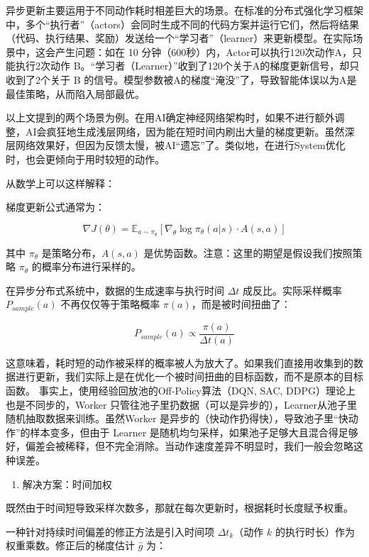 异步更新主要运用于不同动作耗时相差巨大的场景。在标准的分布式强化学习框架中，多个``执行者''（actors）会同时生成不同的代码方案并运行它们，然后将结果（代码、执行结果、奖励）发送给一个``学习者''（learner）来更新模型。在实际场景中，这会产生问题：如在 10 分钟（600秒）内，Actor可以执行120次动作A，只能执行2次动作 B。``学习者（Learner）''收到了120个关于A的梯度更新信号，却只收到了2个关于 B 的信号。模型参数被A的梯度``淹没''了，导致智能体误以为A是最佳策略，从而陷入局部最优。

以上文提到的两个场景为例。在用AI确定神经网络架构时，如果不进行额外调整，AI会疯狂地生成浅层网络，因为能在短时间内刷出大量的梯度更新。虽然深层网络效果好，但因为反馈太慢，被AI``遗忘''了。类似地，在进行System优化时，也会更倾向于用时较短的动作。

从数学上可以这样解释：

梯度更新公式通常为：

\[
\nabla J(\theta)=\mathbb{E}_{a\sim\pi_\theta}\left[\nabla_\theta\log\pi_\theta(a|s)\cdot A(s,a)\right]
\]

其中 \(\pi_\theta\) 是策略分布，\(A(s,a)\) 是优势函数。注意：这里的期望是假设我们按照策略 \(\pi_\theta\) 的概率分布进行采样的。

在异步分布式系统中，数据的生成速率与执行时间 \(\Delta t\) 成反比。实际采样概率 \(P_{sample}(a)\) 不再仅仅等于策略概率 \(\pi(a)\)，而是被时间扭曲了：

\[
P_{sample}(a)\propto \frac{\pi(a)}{\Delta t(a)}
\]

这意味着，耗时短的动作被采样的概率被人为放大了。如果我们直接用收集到的数据进行更新，我们实际上是在优化一个被时间扭曲的目标函数，而不是原本的目标函数。
事实上，使用经验回放池的Off-Policy算法（DQN, SAC, DDPG）理论上也是不同步的，Worker 只管往池子里扔数据（可以是异步的），Learner从池子里随机抽取数据来训练。虽然Worker 是异步的（快动作扔得快），导致池子里``快动作''的样本变多，但由于 Learner 是随机均匀采样，如果池子足够大且混合得足够好，偏差会被稀释，但不完全消除。当动作速度差异不明显时，我们一般会忽略这种误差。

\begin{enumerate}
\def\labelenumi{\arabic{enumi}.}
\setcounter{enumi}{1}
\tightlist
\item
  解决方案：时间加权
\end{enumerate}

既然由于时间短导致采样次数多，那就在每次更新时，根据耗时长度赋予权重。

一种针对持续时间偏差的修正方法是引入时间项 \(\Delta t_k\)（动作 \(k\) 的执行时长）作为权重乘数。修正后的梯度估计 \(\hat{g}\) 为：

